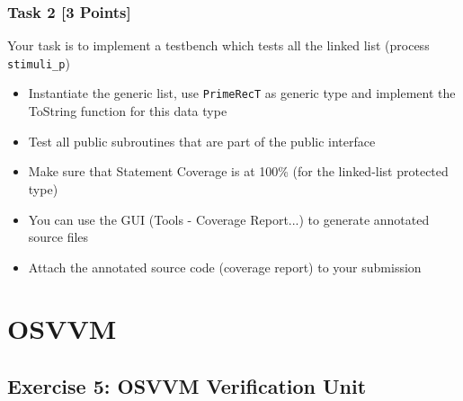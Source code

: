 \documentclass[12pt,epsf,makeidx,oneside]{book}
\begin{document}
  \subsection{Task 2 [3 Points]}
  Your task is to implement a testbench which tests all the linked list (process {\tt stimuli\_p})
  \begin{itemize}[noitemsep]
    \item Instantiate the generic list, use {\tt PrimeRecT} as generic type and implement the ToString function for this data type
    \item Test all public subroutines that are part of the public interface
    \item Make sure that Statement Coverage is at 100\% (for the linked-list protected type)
    \item You can use the GUI (Tools - Coverage Report...) to generate annotated source files
    \item Attach the annotated source code (coverage report) to your submission
  \end{itemize}


\chapter{OSVVM}
  \section{Exercise 5: OSVVM Verification Unit}
\end{document}
